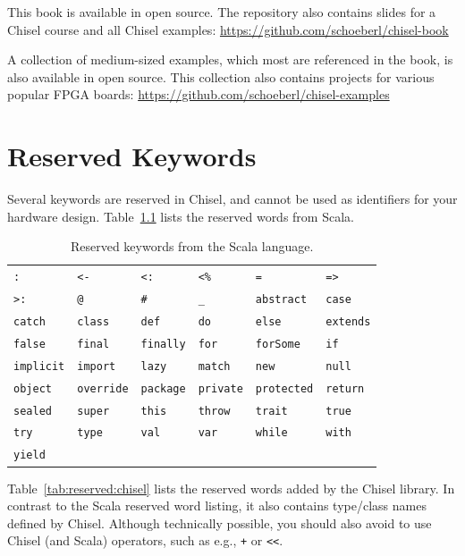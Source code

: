\documentclass[%
    10pt,
    headinclude, footexclude,
    openright, %
    notitlepage,
    cleardoubleempty,
    headsepline,
    pointlessnumbers,
    bibtotoc, idxtotoc,
    ]{scrbook}
\newcommand{\code}[1]{{\small{\texttt{#1}}}}
\begin{document}
This book is available in open source.
The repository also contains slides for a Chisel course and
all Chisel examples: \url{https://github.com/schoeberl/chisel-book}

A collection of medium-sized examples, which most are referenced
in the book, is also available in open source. This collection
also contains projects for various popular FPGA boards:
\url{https://github.com/schoeberl/chisel-examples}

\appendix

\chapter{Reserved Keywords}
\label{sec:reserved}

Several keywords are reserved in Chisel, and cannot be used as identifiers
for your hardware design.
Table~\ref{tab:reserved:scala} lists the reserved words from Scala.

\begin{table}[h]
\centering
\begin{tabular}{llllll}
\code{:}  & \code{<-}  & \code{<:}  & \code{<\%}  & \code{=}  & \code{=>} \\
\code{>:}  & \code{@}  & \code{\#}  & \code{\_}  & \code{abstract}  & \code{case} \\
\code{catch}  & \code{class}  & \code{def}  & \code{do}  & \code{else}  & \code{extends} \\
\code{false}  & \code{final}  & \code{finally}  & \code{for}  & \code{forSome}  & \code{if} \\
\code{implicit}  & \code{import}  & \code{lazy}  & \code{match}  & \code{new}  & \code{null} \\
\code{object}  & \code{override}  & \code{package}  & \code{private}  & \code{protected}  & \code{return} \\
\code{sealed}  & \code{super}  & \code{this}  & \code{throw}  & \code{trait}  & \code{true} \\
\code{try}  & \code{type}  & \code{val}  & \code{var}  & \code{while}  & \code{with} \\
\code{yield}  & \\
\end{tabular}
\caption{Reserved keywords from the Scala language.}
\label{tab:reserved:scala}
\end{table}

Table~\ref{tab:reserved:chisel} lists the reserved words added by the Chisel library.
In contrast to the Scala reserved word listing, it also contains type/class names defined by Chisel.
Although technically possible, you should also avoid to use Chisel (and Scala) operators, such as e.g.,
\code{+} or \code{<<}.
\end{document}
